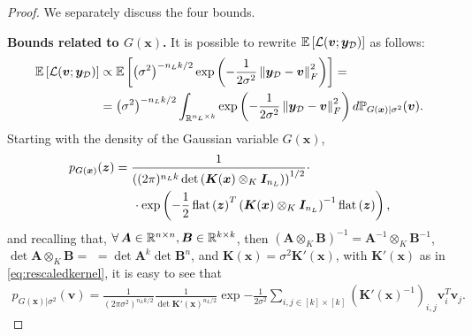 \begin{proof}
	We separately discuss the four bounds.
	
	\textbf{Bounds related to $G(\bm{x})$.}	It is possible to rewrite $\mathbb{E}_{\kern-0.5pt}\left[\mathcal{L}(\bm{v}; \bm{y}_{\mathcal{D}})\right]$ as follows:
	\begin{align} \label{eq:nngpexplikelihood}
		\mathbb{E}_{\kern-0.5pt}\left[\mathcal{L}(\bm{v}; \bm{y}_{\mathcal{D}})\right] & \propto \mathbb{E}_{\kern-0.5pt}\left[\left(\sigma^2\right)^{- n_L k / 2} \operatorname{exp}\left(-\frac{1}{2\sigma^2} \left\lVert\bm{y}_{\mathcal{D}} - \bm{v}\right\rVert_F^2\right)\right] = \nonumber \\
		& = \left(\sigma^2\right)^{- n_L k / 2} \int_{\mathbb{R}^{n_L \times k}} \operatorname{exp}\left(-\frac{1}{2\sigma^2} \left\lVert\bm{y}_{\mathcal{D}} - \bm{v}\right\rVert_F^2\right) d \mathbb{P}_{G(\bm{x}) | \sigma^2}(\bm{v}).
	\end{align}
	Starting with the density of the Gaussian variable $G(\bm{x})$,
	\begin{equation*}
		\begin{aligned}	
			p_{G(\bm{x})}(\bm{z}) & = \frac{1}{\left((2\pi)^{n_L k} \operatorname{det}\left(\bm{K}(\bm{x}) \otimes_K \bm{I}_{n_L}\right)\right)^{1/2}} \cdot \\
			& \kern14.65pt \cdot \operatorname{exp}\left(-\frac{1}{2} \operatorname{flat}\left(\bm{z}\right)^T \left(\bm{K}(\bm{x}) \otimes_K \bm{I}_{n_L} \right)^{-1} \operatorname{flat}\left(\bm{z}\right)\right),
		\end{aligned}
	\end{equation*}
	and recalling that, $\forall \bm{A} \in \real^{n \times n}, \bm{B} \in \real^{k \times k}$, then $(\bm{A} \otimes_K \bm{B})^{-1} = \bm{A}^{-1} \otimes_K \bm{B}^{-1}$, $\det{\bm{A} \otimes_K \bm{B}} =$ $= \det{\bm{A}}^k \det{\bm{B}}^n$, and $\bm{K}(\bm{x}) = \sigma^2 \bm{K}'(\bm{x})$, with $\bm{K}'(\bm{x})$ as in \cref{eq:rescaledkernel}, it is easy to see that 
	\begin{equation} \label{eq:densitynngp}
		\begin{aligned}	
			p_{G(\bm{x}) | \sigma^2}(\bm{v}) = \frac{1}{(2 \pi \sigma^2)^{n_L k / 2}} \frac{1}{\det{\bm{K}'(\bm{x})}^{n_L / 2}} \exp{-\frac{1}{2 \sigma^2} \sum_{i, j \in [k] \times [k]} \left(\bm{K}'(\bm{x})^{-1}\right)_{i, j} \bm{v}_i^T \bm{v}_j}.
		\end{aligned}
	\end{equation}


\end{proof}
